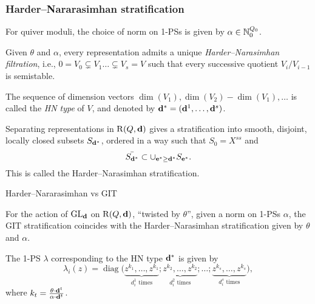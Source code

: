\documentclass{beamer}
\begin{document}
\begin{frame}
    \frametitle{Harder--Nararasimhan stratification}
    For quiver moduli, the choice of norm on 1-PSs is given by $\alpha \in \mathbb{N}^{Q_0}_0$. \pause

\begin{definition}
    Given $\theta$ and $\alpha$, every representation admits a unique \emph{Harder--Narasimhan filtration},
    i.e., $ 0 = V_0 \subsetneq V_1 \dots \subsetneq V_s = V$ such that every successive quotient
    $V_i/V_{i-1}$ is semistable.
\end{definition} \pause
The sequence of dimension vectors $\dim(V_1), \dim(V_2) - \dim(V_1), \dots$ is
called the \emph{HN type} of $V$, and denoted by $\mathbf{d}^* = (\mathbf{d}^1,\dots,\mathbf{d}^s)$. \pause

\begin{theorem}
Separating representations in $\operatorname{R}(Q, \mathbf{d})$ gives
a stratification into smooth, disjoint, locally closed subsets $S_{\mathbf{d}^*}$,
ordered in a way such that $S_0 = X^{ss}$ and
\[\bar{S_{\mathbf{d}^*}} \subset \cup_{\mathbf{e}^* \geq \mathbf{d}^*} S_{\mathbf{e}^*}.\] \pause
This is called the Harder--Narasimhan stratification.
\end{theorem}
\end{frame}
\begin{frame}{Harder--Nararasimhan vs GIT}
    
    \begin{theorem}
        For the action of $\operatorname{\operatorname{GL}_{\mathbf{d}}}$ on $\operatorname{R}(Q, \mathbf{d})$,
        ``twisted by $\theta$'', given a norm on 1-PSs $\alpha$,
        the GIT stratification coincides with the Harder--Narasimhan
        stratification given by $\theta$ and $\alpha$.
    \end{theorem}\pause
    
    \begin{corollary}
        The 1-PS $\lambda$ corresponding to the HN type $\mathbf{d}^*$ is given by
        \[ \lambda_i(z) = \operatorname{diag}\big( \underbrace{z^{k_1},\ldots,z^{k_1}}_{d_i^1 \text{ times}}; \underbrace{z^{k_2},\ldots,z^{k_2}}_{d_i^2 \text{ times}};\ldots; \underbrace{z^{k_s},\ldots,z^{k_s}}_{d_i^s \text{ times}} \big),\]
        where $k_t = \frac{\theta \cdot \mathbf{d}^t}{\alpha \cdot \mathbf{d}^t}$.
    \end{corollary}
    
\end{frame}
\end{document}
